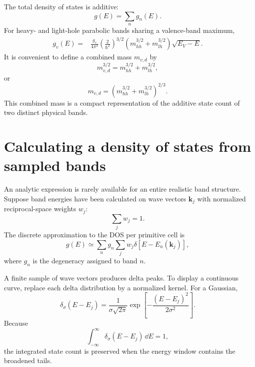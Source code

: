 The total density of states is additive:
\begin{equation}
  g(E)=\sum_n g_n(E).
  \label{eq:dos-band-additivity}
\end{equation}
For heavy- and light-hole parabolic bands sharing a valence-band maximum,
\begin{equation}
\begin{aligned}
  g_v(E)
  ={}&\frac{g_s}{4\pi^2}
  \left(\frac{2}{\hbar^2}\right)^{3/2}
  \left(m_{hh}^{3/2}+m_{lh}^{3/2}\right)
  \sqrt{E_V-E}.
\end{aligned}
  \label{eq:heavy-light-hole-dos-sum}
\end{equation}
It is convenient to define a combined mass $m_{v,d}$ by
\begin{equation}
  m_{v,d}^{3/2}=m_{hh}^{3/2}+m_{lh}^{3/2},
  \label{eq:combined-valence-dos-mass-power}
\end{equation}
or
\begin{equation}
  m_{v,d}
  =\left(m_{hh}^{3/2}+m_{lh}^{3/2}\right)^{2/3}.
  \label{eq:combined-valence-dos-mass}
\end{equation}
This combined mass is a compact representation of the additive state count of
two distinct physical bands.

\section{Calculating a density of states from sampled bands}

An analytic expression is rarely available for an entire realistic band
structure.  Suppose band energies have been calculated on wave vectors
$\bm k_j$ with normalized reciprocal-space weights $w_j$:
\begin{equation}
  \sum_jw_j=1.
  \label{eq:dos-normalized-k-weights}
\end{equation}
The discrete approximation to the DOS per primitive cell is
\begin{equation}
  g(E)
  \simeq\sum_n g_n\sum_jw_j
  \delta\!\left[E-E_n(\bm k_j)\right],
  \label{eq:sampled-band-dos-delta-sum}
\end{equation}
where $g_n$ is the degeneracy assigned to band $n$.

A finite sample of wave vectors produces delta peaks.  To display a continuous
curve, replace each delta distribution by a normalized kernel.  For a Gaussian,
\begin{equation}
  \delta_\sigma(E-E_j)
  =\frac{1}{\sigma\sqrt{2\pi}}
   \exp\left[-\frac{(E-E_j)^2}{2\sigma^2}\right].
  \label{eq:dos-gaussian-kernel}
\end{equation}
Because
\begin{equation}
  \int_{-\infty}^{\infty}
  \delta_\sigma(E-E_j)\,\dd E=1,
  \label{eq:dos-gaussian-normalization}
\end{equation}
the integrated state count is preserved when the energy window contains the
broadened tails.

